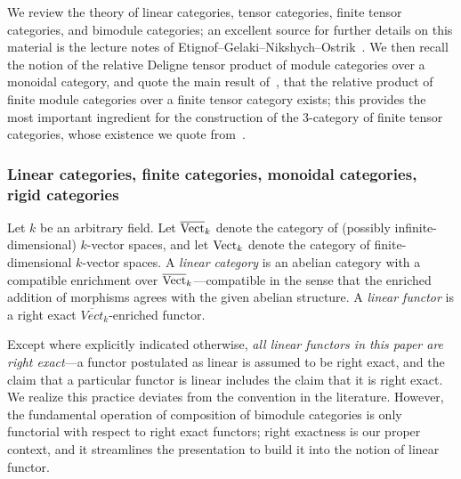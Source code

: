 \documentclass{amsart}
\begin{document}
We review the theory of linear categories, tensor categories, finite tensor categories, and bimodule categories; an excellent source for further details on this material is the lecture notes of Etignof--Gelaki--Nikshych--Ostrik~\cite{EGNO}.  We then recall the notion of the relative Deligne tensor product of module categories over a monoidal category, and quote the main result of~\cite{BTP}, that the relative product of finite module categories over a finite tensor category exists; this provides the most important ingredient for the construction of the 3-category of finite tensor categories, whose existence we quote from~\cite{3TC}.

\subsubsection{Linear categories, finite categories, monoidal categories, rigid categories}

Let $k$ be an arbitrary field.  Let $\overline{\mathrm{Vect}}_k$ denote the category of (possibly infinite-dimensional) $k$-vector spaces, and let $\mathrm{Vect}_k$ denote the category of finite-dimensional $k$-vector spaces.  A \emph{linear category} is an abelian category with a compatible enrichment over $\overline{\mathrm{Vect}}_k$---compatible in the sense that the enriched addition of morphisms agrees with the given abelian structure.  A \emph{linear functor} is a right exact $\overline{Vect}_k$-enriched functor. %

\begin{warning}
Except where explicitly indicated otherwise, \emph{all linear functors in this paper are right exact}---a functor postulated as linear is assumed to be right exact, and the claim that a particular functor is linear includes the claim that it is right exact.  We realize this practice deviates from the convention in the literature.  However, the fundamental operation of composition of bimodule categories is only functorial with respect to right exact functors; right exactness is our proper context, and it streamlines the presentation to build it into the notion of linear functor.
\end{warning}
\end{document}
